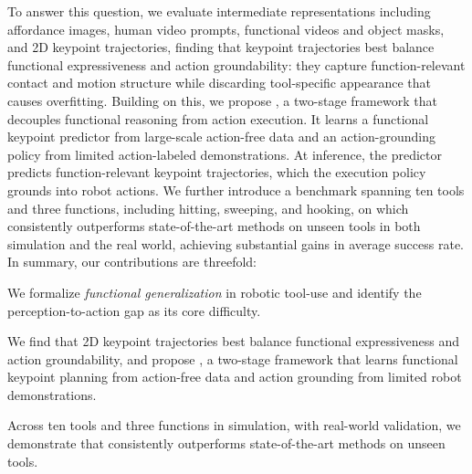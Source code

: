 To answer this question, we evaluate intermediate representations 
including affordance images, human video prompts, {functional videos and object masks}, and 2D keypoint trajectories, 
finding that keypoint trajectories best balance functional expressiveness and 
action groundability: they capture function-relevant contact and motion structure 
while discarding tool-specific appearance that causes overfitting. Building on 
this, we propose \algoname{}, a two-stage framework that 
decouples functional reasoning from action execution.
{It learns a functional keypoint predictor from large-scale action-free data and an action-grounding policy from limited action-labeled demonstrations. At inference, the predictor predicts function-relevant keypoint trajectories, which the execution policy grounds into robot actions.
We further introduce a benchmark spanning ten tools and three functions, including hitting, sweeping, and hooking, on which \algoname{} consistently outperforms state-of-the-art methods on unseen tools in both simulation and the real world, achieving substantial gains in average success rate.}
In summary, our contributions are threefold:
\begin{itemize}[leftmargin=*]
    \item We formalize \textit{functional generalization} in robotic tool-use and identify the perception-to-action gap as its core difficulty.
    \item We find that 2D keypoint trajectories best balance functional 
    expressiveness and action groundability, and propose \algoname{}, {a two-stage framework that learns functional keypoint planning from action-free data and action grounding from limited robot demonstrations.}
   {\item Across ten tools and three functions in simulation, with real-world validation, we demonstrate that \algoname{} consistently outperforms state-of-the-art methods on unseen tools.}
\end{itemize}


